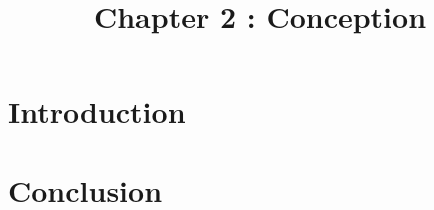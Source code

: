 \documentclass[12pt]{article}
\begin{document}
	\listoffigures
	\title{Chapter 2 : Conception}
	\maketitle
	
	\section{Introduction}
	\section{Conclusion}
	
\end{document}
